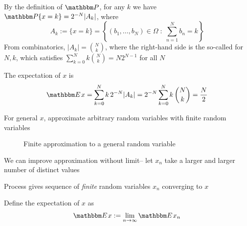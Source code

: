 \begin{frame}
    
    \vspace{2em}
    By the definition of $\PP$, for any $k$ we have
    $\PP\{x = k\} = 2^{-N} |A_k|$, where
    \begin{equation*}
         A_k :=
         \{x = k\}
         = \left\{
               (b_1, \ldots, b_N) \in \Omega
                \; : \;
                \sum_{n=1}^N b_n = k
           \right\}
    \end{equation*}
    From combinatorics, $|A_k| =
    \binom{N}{k}$, where the right-hand side is the so-called  for $N,k$, which satisfies
    $\sum_{k=0}^N k \binom{N}{k} = N 2^{N-1}$ for all $N$
    
    The expectation of $x$ is 
    \begin{equation*}
        \EE x 
        = \sum_{k=0}^N k \, 2^{-N} |A_k|
        = 2^{-N} \sum_{k=0}^N k \, \binom{N}{k} 
        = \frac{N}{2}
    \end{equation*}
\end{frame}


\begin{frame}

    \vspace{2em}
    For general $x$, approximate arbitrary random variables with finite random variables 
    
    \begin{figure}
   \begin{center}
       \scalebox{0.8}{}
    \caption{\label{f:finite_rv_approx} Finite approximation to a general random variable}
   \end{center}
    \end{figure}
    
\end{frame}


\begin{frame}
    
    \vspace{2em}
    We can improve approximation without limit-- let $x_n$ take a larger 
    and larger number of distinct values
    
    Process gives sequence of \emph{finite} random variables $x_n$
    converging to $x$
    
    Define the expectation of $x$ as
    \begin{equation*}
        \label{eq:extar}
        \EE x := \lim_{n \to \infty} \EE x_n
    \end{equation*}

\end{frame}

